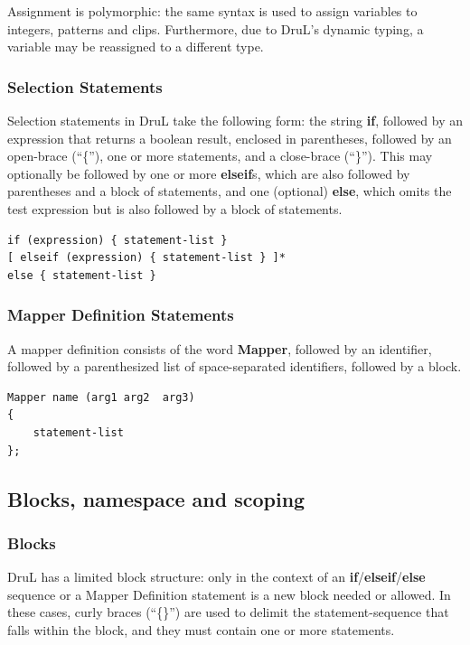 \documentclass[11pt,twoside]{article}
\begin{document}
Assignment is polymorphic: the same syntax is used to assign variables to
integers, patterns and clips. Furthermore, due to DruL's dynamic typing,
a variable may be reassigned to a different type.

\subsubsection{Selection Statements}

Selection statements in DruL take the following form: the string \textbf{if}, followed by an expression that returns a boolean result, enclosed in parentheses, followed by an open-brace (``\{''), one or more statements, and a close-brace (``\}'').  This may optionally be followed by one or more \textbf{elseif}s, which are also followed by parentheses and a block of statements, and one (optional) \textbf{else}, which omits the test expression but is also followed by a block of statements.

\begin{verbatim}
if (expression) { statement-list } 
[ elseif (expression) { statement-list } ]*
else { statement-list }
\end{verbatim}

\subsubsection{Mapper Definition Statements}

A mapper definition consists of the word \textbf{Mapper}, followed by an identifier, followed by a parenthesized list of space-separated identifiers, followed by a block.

\begin{verbatim}
Mapper name (arg1 arg2  arg3)
{
    statement-list
};
\end{verbatim}

\subsection{Blocks, namespace and scoping}

\subsubsection{Blocks}
DruL has a limited block structure: only in the context of an \textbf{if}/\textbf{elseif}/\textbf{else} sequence or a Mapper Definition statement is a new block needed or allowed.  In these cases, curly braces (``\{\}'') are used to delimit the statement-sequence that falls within the block, and they must contain one or more statements.
\end{document}
